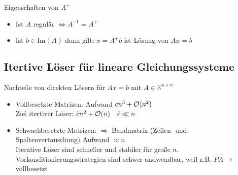 Eigenschaften von $A^+$
\begin{itemize}
  \item Ist $A$ regulär $\Leftrightarrow A^{-1} = A^+$
  \item Ist $b \in \mathrm{Im}(A)$ dann gilt: $x = A^+ b$ ist Lösung von $Ax = b$
\end{itemize}

\subsection{Itertive Löser für lineare Gleichungssysteme}
Nachteile von direkten Lösern für $Ax=b$ mit $A \in \mathbb{K}^{n \times n}$
\begin{itemize}
  \item Vollbesetzte Matrizen: Aufwand $cn^3 + \mathcal{O}(n^2)$ \\ Ziel itertiver Löser: $\tilde{c} n^2 + \mathcal{O}(n) \quad \tilde{c} \ll n$
  \item Schwachbesetzte Matrizen: $\Rightarrow$ Bandmatrix (Zeilen- und Spaltenvertauschung) Aufwand $\approx n$\\
    Iterative Löser sind schneller und stabiler für große $n$. Vorkonditionierungsstrategien sind schwer andwendbar, weil z.B. $PA \rightarrow$ vollbesetzt
\end{itemize}
